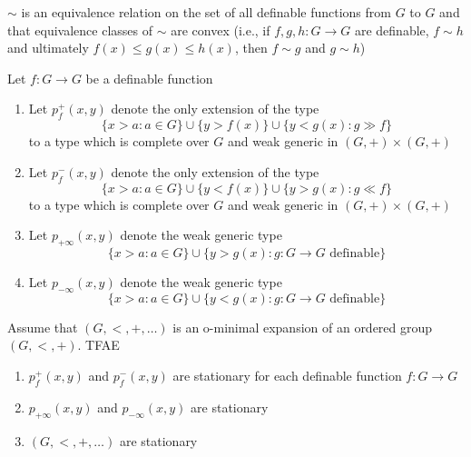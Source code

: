 \documentclass[11pt]{article}
\begin{document}
\(\sim\) is an equivalence relation on the set of all definable functions from \(G\) to \(G\) and
that equivalence classes of \(\sim\) are convex (i.e., if \(f,g,h:G\to G\) are definable, \(f\sim h\)
and ultimately \(f(x)\le g(x)\le h(x)\), then \(f\sim g\) and \(g\sim h\))

\begin{definition}[]
Let \(f:G\to G\) be a definable function
\begin{enumerate}
\item Let \(p_f^+(x,y)\) denote the only extension of the type
\begin{equation*}
\{x>a:a\in G\}\cup\{y>f(x)\}\cup\{y<g(x):g\gg f\}
\end{equation*}
to a type which is complete over \(G\) and weak generic in \((G,+)\times(G,+)\)
\item Let \(p_f^-(x,y)\) denote the only extension of the type
\begin{equation*}
\{x>a:a\in G\}\cup\{y<f(x)\}\cup\{y>g(x):g\ll f\}
\end{equation*}
to a type which is complete over \(G\) and weak generic in \((G,+)\times(G,+)\)
\item Let \(p_{+\infty}(x,y)\) denote the weak generic type
\begin{equation*}
\{x>a:a\in G\}\cup\{y>g(x):g:G\to G\text{ definable}\}
\end{equation*}
\item Let \(p_{-\infty}(x,y)\) denote the weak generic type
\begin{equation*}
\{x>a:a\in G\}\cup\{y<g(x):g:G\to G\text{ definable}\}
\end{equation*}
\end{enumerate}
\end{definition}

\begin{theorem}[]
\label{3.4.7}
Assume that \((G,<,+,\dots)\) is an o-minimal expansion of an ordered group \((G,<,+)\). TFAE
\begin{enumerate}
\item \(p_f^+(x,y)\) and \(p_f^-(x,y)\) are stationary for each definable function \(f:G\to G\)
\item \(p_{+\infty}(x,y)\) and \(p_{-\infty}(x,y)\) are stationary
\item \((G,<,+,\dots)\) are stationary
\end{enumerate}
\end{theorem}
\end{document}
